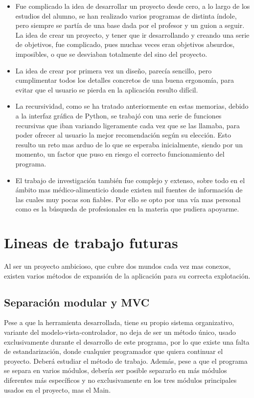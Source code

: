 \begin{itemize}
\item	Fue complicado la idea de desarrollar un proyecto desde cero, a lo largo de los estudios del alumno, se han realizado varios programas de distinta índole, pero siempre se partía de una base dada por el profesor y un guion a seguir. La idea de crear un proyecto, y tener que ir desarrollando y creando una serie de objetivos, fue complicado, pues muchas veces eran objetivos absurdos, imposibles, o que se desviaban totalmente del sino del proyecto.
\item	La idea de crear por primera vez un diseño, parecía sencillo, pero cumplimentar todos los detalles concretos de una buena ergonomía, para evitar que el usuario se pierda en la aplicación resulto difícil.
\item	La recursividad, como se ha tratado anteriormente en estas memorias, debido a la interfaz gráfica de Python, se trabajó con una serie de funciones recursivas que iban variando ligeramente cada vez que se las llamaba, para poder ofrecer al usuario la mejor recomendación según su elección. Esto resulto un reto mas arduo de lo que se esperaba inicialmente, siendo por un momento, un factor que puso en riesgo el correcto funcionamiento del programa.
\item	El trabajo de investigación también fue complejo y extenso, sobre todo en el ámbito mas médico-alimenticio donde existen mil fuentes de información de las cuales muy pocas son fiables. Por ello se opto por una vía mas personal como es la búsqueda de profesionales en la materia que pudiera apoyarme.
\end{itemize}

\section{Lineas de trabajo futuras}
Al ser un proyecto ambicioso, que cubre dos mundos cada vez mas conexos, existen varios métodos de expansión de la aplicación para su correcta explotación.
\subsection{Separación modular y MVC}
Pese a que la herramienta desarrollada, tiene su propio sistema organizativo, variante del modelo-vista-controlador, no deja de ser un método único, usado exclusivamente durante el desarrollo de este programa, por lo que existe una falta de estandarización, donde cualquier programador que quiera continuar el proyecto. Deberá estudiar el método de trabajo. Además, pese a que el programa se separa en varios módulos, debería ser posible separarlo en más módulos diferentes más específicos y no exclusivamente en los tres módulos principales usados en el proyecto, mas el Main.
